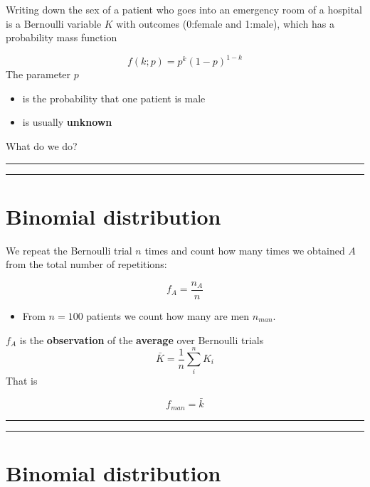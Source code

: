 \documentclass[
]{book}
\providecommand{\tightlist}{%
  \setlength{\itemsep}{0pt}\setlength{\parskip}{0pt}}
\begin{document}
Writing down the sex of a patient who goes into an emergency room of a hospital is a Bernoulli variable \(K\) with outcomes (0:female and 1:male), which has a probability mass function

\[f(k; p)=p^k(1-p)^{1-k} \]
The parameter \(p\)

\begin{itemize}
\item
  is the probability that one patient is male
\item
  is usually \textbf{unknown}
\end{itemize}

What do we do?

\begin{center}\rule{0.5\linewidth}{0.5pt}\end{center}

\begin{center}\rule{0.5\linewidth}{0.5pt}\end{center}

\hypertarget{binomial-distribution-4}{%
\section{Binomial distribution}\label{binomial-distribution-4}}

We repeat the Bernoulli trial \(n\) times and count how many times we obtained \(A\) from the total number of repetitions:

\[f_A=\frac{n_A}{n}\]

\begin{itemize}
\tightlist
\item
  From \(n=100\) patients we count how many are men \(n_{man}\).
\end{itemize}

\(f_A\) is the \textbf{observation} of the \textbf{average} over Bernoulli trials \[\bar{K}=\frac{1}{n}\sum_i^n K_i\]
That is

\[f_{man}=\bar{k}\]

\begin{center}\rule{0.5\linewidth}{0.5pt}\end{center}

\begin{center}\rule{0.5\linewidth}{0.5pt}\end{center}

\hypertarget{binomial-distribution-5}{%
\section{Binomial distribution}\label{binomial-distribution-5}}
\end{document}
